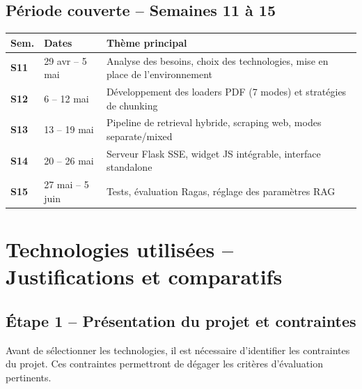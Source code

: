 \documentclass[12pt,a4paper]{report}
\begin{document}
\section{P\'{e}riode couverte -- Semaines 11 \`{a} 15}

\begin{center}
\renewcommand{\arraystretch}{1.4}
\begin{tabular}{>{\bfseries}p{1.5cm} p{3cm} p{8cm}}
  \toprule
  \rowcolor{rowblue}
  \textbf{Sem.} & \textbf{Dates} & \textbf{Th\`{e}me principal} \\
  \midrule
  S11 & 29 avr -- 5 mai & Analyse des besoins, choix des technologies, mise en place de l'environnement \\
  S12 & 6 -- 12 mai & D\'{e}veloppement des loaders PDF (7 modes) et strat\'{e}gies de chunking \\
  S13 & 13 -- 19 mai & Pipeline de retrieval hybride, scraping web, modes separate/mixed \\
  S14 & 20 -- 26 mai & Serveur Flask SSE, widget JS int\'{e}grable, interface standalone \\
  S15 & 27 mai -- 5 juin & Tests, \'{e}valuation Ragas, r\'{e}glage des param\`{e}tres RAG \\
  \bottomrule
\end{tabular}
\end{center}

\chapter{Technologies utilis\'{e}es -- Justifications et comparatifs}

\section{\'{E}tape 1 -- Pr\'{e}sentation du projet et contraintes}

Avant de s\'{e}lectionner les technologies, il est n\'{e}cessaire d'identifier les contraintes
du projet. Ces contraintes permettront de d\'{e}gager les crit\`{e}res d'\'{e}valuation pertinents.
\end{document}
